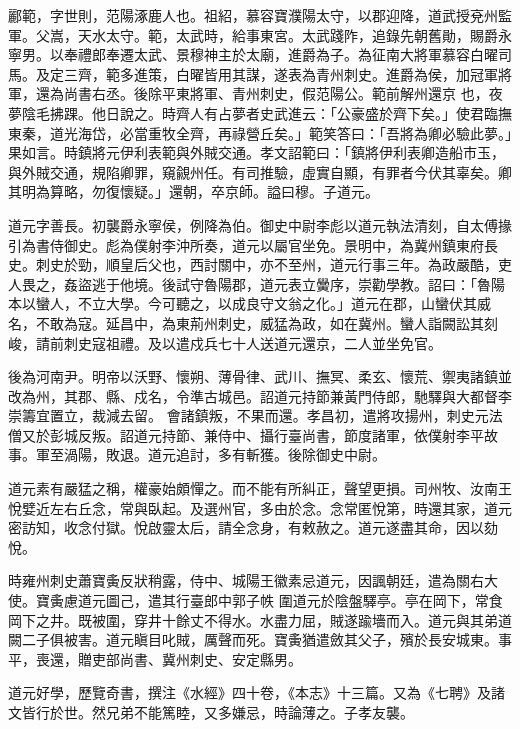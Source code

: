\begin{pinyinscope}
 酈範，字世則，范陽涿鹿人也。祖紹，慕容寶濮陽太守，以郡迎降，道武授兗州監軍。父嵩，天水太守。範，太武時，給事東宮。太武踐阼，追錄先朝舊勛，賜爵永寧男。以奉禮郎奉遷太武、景穆神主於太廟，進爵為子。為征南大將軍慕容白曜司馬。及定三齊，範多進策，白曜皆用其謀，遂表為青州刺史。進爵為侯，加冠軍將軍，還為尚書右丞。後除平東將軍、青州刺史，假范陽公。範前解州還京
 也，夜夢陰毛拂踝。他日說之。時齊人有占夢者史武進云：「公豪盛於齊下矣。」使君臨撫東秦，道光海岱，必當重牧全齊，再祿營丘矣。」範笑答曰：「吾將為卿必驗此夢。」果如言。時鎮將元伊利表範與外賊交通。孝文詔範曰：「鎮將伊利表卿造船市玉，與外賊交通，規陷卿罪，窺覦州任。有司推驗，虛實自顯，有罪者今伏其辜矣。卿其明為算略，勿復懷疑。」還朝，卒京師。謚曰穆。子道元。



 道元字善長。初襲爵永寧侯，例降為伯。御史中尉李彪以道元執法清刻，自太傅掾引為書侍御史。彪為僕射李沖所奏，道元以屬官坐免。景明中，為冀州鎮東府長
 史。刺史於勁，順皇后父也，西討關中，亦不至州，道元行事三年。為政嚴酷，吏人畏之，姦盜逃于他境。後試守魯陽郡，道元表立黌序，崇勸學教。詔曰：「魯陽本以蠻人，不立大學。今可聽之，以成良守文翁之化。」道元在郡，山蠻伏其威名，不敢為寇。延昌中，為東荊州刺史，威猛為政，如在冀州。蠻人詣闕訟其刻峻，請前刺史寇祖禮。及以遣戍兵七十人送道元還京，二人並坐免官。



 後為河南尹。明帝以沃野、懷朔、薄骨律、武川、撫冥、柔玄、懷荒、禦夷諸鎮並改為州，其郡、縣、戍名，令準古城邑。詔道元持節兼黃門侍郎，馳驛與大都督李崇籌宜置立，裁減去留。
 會諸鎮叛，不果而還。孝昌初，遣將攻揚州，刺史元法僧又於彭城反叛。詔道元持節、兼侍中、攝行臺尚書，節度諸軍，依僕射李平故事。軍至渦陽，敗退。道元追討，多有斬獲。後除御史中尉。



 道元素有嚴猛之稱，權豪始頗憚之。而不能有所糾正，聲望更損。司州牧、汝南王悅嬖近左右丘念，常與臥起。及選州官，多由於念。念常匿悅第，時還其家，道元密訪知，收念付獄。悅啟靈太后，請全念身，有敕赦之。道元遂盡其命，因以劾悅。



 時雍州刺史蕭寶夤反狀稍露，侍中、城陽王徽素忌道元，因諷朝廷，遣為關右大使。寶夤慮道元圖己，遣其行臺郎中郭子帙
 圍道元於陰盤驛亭。亭在岡下，常食岡下之井。既被圍，穿井十餘丈不得水。水盡力屈，賊遂踰墻而入。道元與其弟道闕二子俱被害。道元瞋目叱賊，厲聲而死。寶夤猶遣斂其父子，殯於長安城東。事平，喪還，贈吏部尚書、冀州刺史、安定縣男。



 道元好學，歷覽奇書，撰注《水經》四十卷，《本志》十三篇。又為《七聘》及諸文皆行於世。然兄弟不能篤睦，又多嫌忌，時論薄之。子孝友襲。




\end{pinyinscope}
